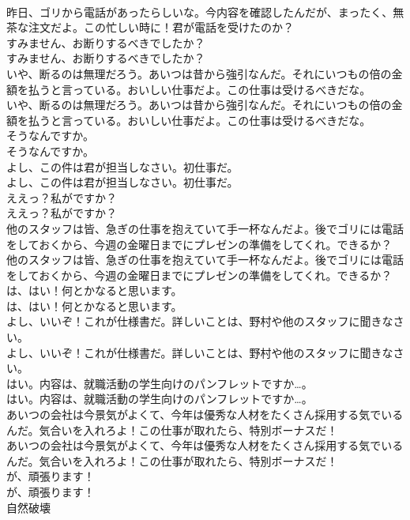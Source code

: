 \documentclass[8pt]{extreport}
\begin{document}
\begin{CJK}{UTF8}{min}
\\	昨日、ゴリから電話があったらしいな。今内容を確認したんだが、まったく、無茶な注文だよ。この忙しい時に！君が電話を受けたのか？ 
\\	すみません、お断りするべきでしたか？	
\\	すみません、お断りするべきでしたか？ 
\\	いや、断るのは無理だろう。あいつは昔から強引なんだ。それにいつもの倍の金額を払うと言っている。おいしい仕事だよ。この仕事は受けるべきだな。	
\\	いや、断るのは無理だろう。あいつは昔から強引なんだ。それにいつもの倍の金額を払うと言っている。おいしい仕事だよ。この仕事は受けるべきだな。 
\\	そうなんですか。	
\\	そうなんですか。 
\\	よし、この件は君が担当しなさい。初仕事だ。	
\\	よし、この件は君が担当しなさい。初仕事だ。 
\\	ええっ？私がですか？	
\\	ええっ？私がですか？ 
\\	他のスタッフは皆、急ぎの仕事を抱えていて手一杯なんだよ。後でゴリには電話をしておくから、今週の金曜日までにプレゼンの準備をしてくれ。できるか？	
\\	他のスタッフは皆、急ぎの仕事を抱えていて手一杯なんだよ。後でゴリには電話をしておくから、今週の金曜日までにプレゼンの準備をしてくれ。できるか？ 
\\	は、はい！何とかなると思います。	
\\	は、はい！何とかなると思います。 
\\	よし、いいぞ！これが仕様書だ。詳しいことは、野村や他のスタッフに聞きなさい。	
\\	よし、いいぞ！これが仕様書だ。詳しいことは、野村や他のスタッフに聞きなさい。 
\\	はい。内容は、就職活動の学生向けのパンフレットですか…。	
\\	はい。内容は、就職活動の学生向けのパンフレットですか…。 
\\	あいつの会社は今景気がよくて、今年は優秀な人材をたくさん採用する気でいるんだ。気合いを入れろよ！この仕事が取れたら、特別ボーナスだ！	
\\	あいつの会社は今景気がよくて、今年は優秀な人材をたくさん採用する気でいるんだ。気合いを入れろよ！この仕事が取れたら、特別ボーナスだ！ 
\\	が、頑張ります！	
\\	が、頑張ります！ 
\\	自然破壊

\end{CJK}
\end{document}
